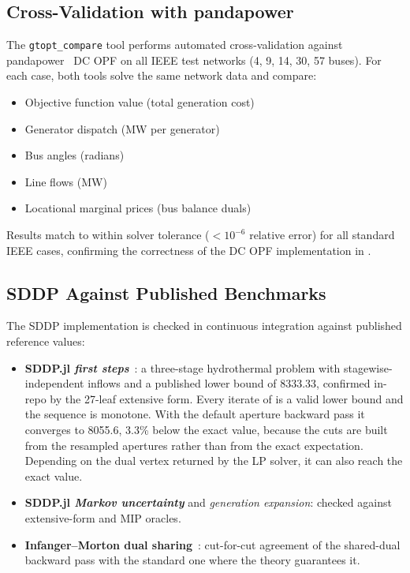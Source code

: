 \subsection{Cross-Validation with pandapower}

The \texttt{gtopt\_compare} tool performs automated cross-validation
against pandapower~\cite{thurner2018pandapower} DC OPF on all IEEE test
networks (4, 9, 14, 30, 57 buses).  For each case, both tools solve the
same network data and compare:

\begin{itemize}
  \item Objective function value (total generation cost)
  \item Generator dispatch (MW per generator)
  \item Bus angles (radians)
  \item Line flows (MW)
  \item Locational marginal prices (bus balance duals)
\end{itemize}

Results match to within solver tolerance ($<10^{-6}$ relative error)
for all standard IEEE cases, confirming the correctness of the DC OPF
implementation in \gtopt{}.

\subsection{SDDP Against Published Benchmarks}
\label{sec:sddp_bench}

The SDDP implementation is checked in continuous integration against
published reference values:
\begin{itemize}
  \item \textbf{SDDP.jl \emph{first steps}}~\cite{dowson2020sddp_jl}: a
    three-stage hydrothermal problem with stagewise-independent inflows
    and a published lower bound of 8333.33, confirmed in-repo by the
    27-leaf extensive form.  Every iterate of \gtopt{} is a valid lower
    bound and the sequence is monotone.  With the default aperture
    backward pass it converges to 8055.6, 3.3\% below the exact value,
    because the cuts are built from the resampled apertures rather than
    from the exact expectation.  Depending on the dual vertex returned
    by the LP solver, it can also reach the exact value.
  \item \textbf{SDDP.jl \emph{Markov uncertainty}} and
    \emph{generation expansion}: checked against extensive-form and
    MIP oracles.
  \item \textbf{Infanger--Morton dual sharing}~\cite{infanger1996cutsharing}:
    cut-for-cut agreement
    of the shared-dual backward pass with the standard one where the
    theory guarantees it.
\end{itemize}

